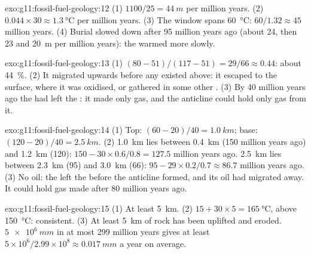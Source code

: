 \begin{solution}{exo:g11:fossil-fuel-geology:12}
(1) $1100/25 = \qty{44}{m}$ per million years. (2) $0.044 \times 30
\approx \qty{1.3}{\degreeCelsius}$ per million years. (3) The window spans
\qty{60}{\degreeCelsius}: $60/1.32 \approx 45$ million years. (4) Burial
slowed down after 95 million years ago (about 24, then 23 and
\qty{20}{m} per million years): the  warmed more slowly.
\end{solution}

\begin{solution}{exo:g11:fossil-fuel-geology:13}
(1) $(80 - 51)/(117 - 51) = 29/66 \approx 0.44$: about \qty{44}{\percent}.
(2) It migrated upwards before any  existed above: it escaped to the
surface, where it was oxidised, or gathered in some other . (3) By 40
million years ago the  had left the : it made only gas,
and the anticline could hold only gas from it.
\end{solution}

\begin{solution}{exo:g11:fossil-fuel-geology:14}
(1) Top: $(60 - 20)/40 = \qty{1.0}{km}$; base: $(120 - 20)/40 =
\qty{2.5}{km}$. (2) \qty{1.0}{km} lies between \qty{0.4}{km} (150 million
years ago) and \qty{1.2}{km} (120): $150 - 30 \times 0.6/0.8 = 127.5$
million years ago. \qty{2.5}{km} lies between \qty{2.3}{km} (95) and
\qty{3.0}{km} (66): $95 - 29 \times 0.2/0.7 \approx 86.7$ million years
ago. (3) No oil: the  left the  before the anticline
formed, and its oil had migrated away. It could hold gas made after 80
million years ago.
\end{solution}

\begin{solution}{exo:g11:fossil-fuel-geology:15}
(1) At least \qty{5}{km}. (2) $15 + 30 \times 5 = \qty{165}{\degreeCelsius}$,
above \qty{150}{\degreeCelsius}: consistent. (3) At least \qty{5}{km} of
rock has been uplifted and eroded. $\qty{5e6}{mm}$ in at most
\num{299} million years gives at least $5 \times 10^6/2.99 \times 10^8
\approx \qty{0.017}{mm}$ a year on average.
\end{solution}

